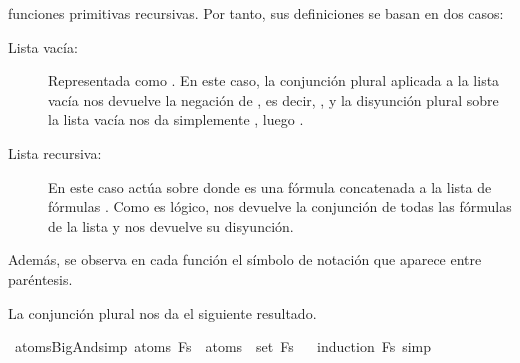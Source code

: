 \begin{isabellebody}
\begin{isamarkuptext}
  funciones primitivas recursivas. Por tanto, sus definiciones se basan 
  en dos casos:
  \begin{description}
    \item[Lista vacía:] Representada como . En este caso, la 
      conjunción plural aplicada a la lista vacía nos devuelve la 
      negación de , es decir, , y la disyunción plural 
      sobre la lista vacía nos da simplemente , luego . 
    \item[Lista recursiva:] En este caso actúa sobre  donde  
      es una fórmula concatenada a la lista de fórmulas . Como es 
      lógico,  nos devuelve la conjunción de todas las 
      fórmulas de la lista y  nos devuelve su disyunción.
  \end{description}

  Además, se observa en cada función el símbolo de notación que aparece 
  entre paréntesis.

  La conjunción plural nos da el siguiente resultado.%
\end{isamarkuptext}\isamarkuptrue%
\isamarkupfalse%
\ atoms{\isacharunderscore}BigAnd{\isacharbrackleft}simp{\isacharbrackright}{\isacharcolon}\ {\isachardoublequoteopen}atoms\ {\isacharparenleft}\isactrlbold {\isasymAnd}Fs{\isacharparenright}\ {\isacharequal}\ {\isasymUnion}{\isacharparenleft}atoms\ {\isacharbackquote}\ set\ Fs{\isacharparenright}{\isachardoublequoteclose}\isanewline
%
\isadelimproof
\ \ %
\endisadelimproof
%
\isatagproof
{}\isamarkupfalse%
{\isacharparenleft}induction\ Fs{\isacharsemicolon}\ simp{\isacharparenright}\isanewline
\isanewline
%
\endisatagproof
{\isafoldproof}%
%
\isadelimproof
%
\endisadelimproof
%
\isadelimtheory
%
\endisadelimtheory
%
\isatagtheory
%
\endisatagtheory
{\isafoldtheory}%
%
\isadelimtheory
%
\endisadelimtheory
%
\end{isabellebody}%
\endinput
